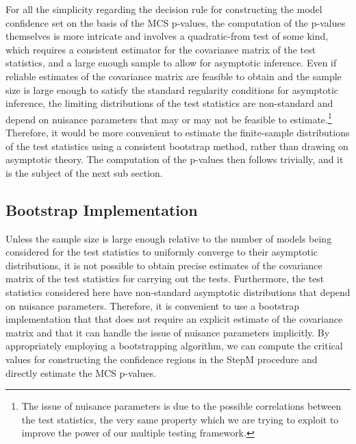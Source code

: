 \documentclass{article} %
\begin{document}
	For all the simplicity regarding the decision rule for constructing the model confidence set on the basis of the MCS p-values, the computation of the p-values themselves is more intricate and involves a quadratic-from test of some kind, which requires a consistent estimator for the covariance matrix of the test statistics, and a large enough sample to allow for asymptotic inference. Even if reliable estimates of the covariance matrix are feasible to obtain and the sample size is large enough to satisfy the standard regularity conditions for asymptotic inference, the limiting distributions of the test statistics are non-standard and depend on nuisance parameters that may or may not be feasible to estimate.\footnote{The issue of nuisance parameters is due to the possible correlations between the test statistics, the very same property which we are trying to exploit to improve the power of our multiple testing framework.} Therefore, it would be more convenient to estimate the finite-sample distributions of the test statistics using a consistent bootstrap method, rather than drawing on asymptotic theory. The computation of the p-values then follows trivially, and it is the subject of the next sub section.
	
	\subsection{Bootstrap Implementation}\label{sec:bootstrap}
	Unless the sample size is large enough relative to the number of models being considered for the test statistics to uniformly converge to their asymptotic distributions, it is not possible to obtain precise estimates of the covariance matrix of the test statistics for carrying out the tests. Furthermore, the test statistics considered here have non-standard asymptotic distributions that depend on nuisance parameters. Therefore, it is convenient to use a bootstrap implementation that that does not require an explicit estimate of the covariance matrix and that it can handle the issue of nuisance parameters implicitly. By appropriately employing a bootstrapping algorithm, we can compute the critical values for constructing the confidence regions in the StepM procedure and directly estimate the MCS p-values.
	
\end{document}
